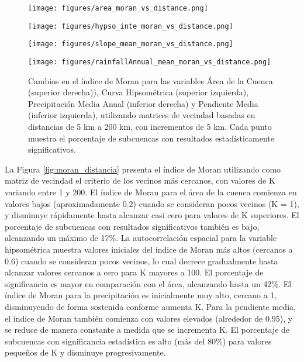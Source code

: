 \documentclass[
  manuscript=article,  
  layout=preprint,  
  year=2023,
  volume=0,
]{format}
\begin{document}
\begin{figure}[ht!]
    \centering
    \begin{minipage}{0.48\textwidth}
        \centering
        \texttt{[image: figures/area\_moran\_vs\_distance.png]}
    \end{minipage}%
    \hfill
    \begin{minipage}{0.48\textwidth}
        \centering
        \texttt{[image: figures/hypso\_inte\_moran\_vs\_distance.png]}
    \end{minipage}
    
    \vspace{0.5cm} %
    
    \begin{minipage}{0.48\textwidth}
        \centering
        \texttt{[image: figures/slope\_mean\_moran\_vs\_distance.png]}
    \end{minipage}%
    \hfill
    \begin{minipage}{0.48\textwidth}
        \centering
        \texttt{[image: figures/rainfallAnnual\_mean\_moran\_vs\_distance.png]}
    \end{minipage}
    \label{moran_vecinos}
     \caption{Cambios en el índice de Moran para las variables Área de la Cuenca (superior derecha)), Curva Hipsométrica (superior izquierda), Precipitación Media Anual (inferior derecha) y Pendiente Media (inferior izquierda), utilizando matrices de vecindad basadas en distancias de 5 km a 200 km, con incrementos de 5 km. Cada punto muestra el porcentaje de subcuencas con resultados estadísticamente significativos.}
\end{figure}

La Figura \ref{fig:moran_distancia} presenta  el índice de Moran utilizando como matriz de vecindad el criterio de los vecinos más cercanos, con valores de K variando entre 1 y 200. El índice de Moran para el área de la cuenca comienza en valores bajos (aproximadamente 0.2) cuando se consideran pocos vecinos (K = 1), y disminuye rápidamente hasta alcanzar casi cero para valores de K superiores. El porcentaje de subcuencas con resultados significativos también es bajo, alcanzando un máximo de 17\%. La autocorrelación espacial para la variable hipsométrica muestra valores iniciales del índice de Moran más altos (cercanos a 0.6) cuando se consideran pocos vecinos, lo cual decrece gradualmente hasta alcanzar valores cercanos a cero para K mayores a 100. El porcentaje de significancia es mayor en comparación con el área, alcanzando hasta un 42\%. El índice de Moran para la precipitación es inicialmente muy alto, cercano a 1, disminuyendo de forma sostenida conforme aumenta K. Para la pendiente media, el índice de Moran también comienza con valores elevados (alrededor de 0.95), y se reduce de manera constante a medida que se incrementa K. El porcentaje de subcuencas con significancia estadística es alto (más del 80\%) para valores pequeños de K y disminuye progresivamente.
\end{document}
